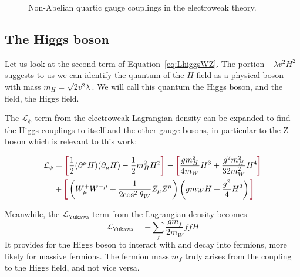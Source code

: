\begin{figure}[!hbt]
 \caption{Non-Abelian quartic gauge couplings in the electroweak theory.} \label{fig:4GC}
\end{figure}

\subsection{The Higgs boson}

Let us look at the second term of Equation~\ref{eq:LhiggsWZ}.
The portion $-\lambda v^2 H^2 $ suggests to us we can identify the quantum of the $H$-field as a physical boson with mass $m_H = \sqrt{2v^2\lambda}$.
We will call this quantum the Higgs boson, and the field, the Higgs field.

The $\mathcal{L}_\mathrm{\phi}$ term from the electroweak Lagrangian density can be expanded to find the Higgs couplings to itself and the other gauge bosons, in particular to the Z boson which is relevant to this work:

\begin{equation}
\begin{split}
\label{eq:L_phi}
\mathcal{L}_\mathrm{\phi} & = \termLB \frac{1}{2} (\partial^\mu H) (\partial_\mu H) - \frac{1}{2}m_H^2 H^2 \termRB - \termLB \frac{gm_H^2}{4m_W} H^3 + \frac{g^2m_H^2}{32m_W^2}H^4 \termRB \\
& + \termLB \left( W_\mu^+ W^{{-}\mu} + \frac{1}{2\mathrm{cos}^2\:\theta_W} Z_\mu Z^\mu \right) \left( gm_WH+\frac{g^2}{4}H^2 \right) \termRB
\end{split}
\end{equation}

Meanwhile, the $\mathcal{L}_\mathrm{Yukawa}$ term from the Lagrangian density becomes
\begin{equation}
\label{L_Yukawa}
\mathcal{L}_\mathrm{Yukawa} = {-} \sum_f \frac{gm_f}{2m_W} \bar{f}fH
\end{equation}
It provides for the Higgs boson to interact with and decay into fermions,
more likely for massive fermions.
The fermion mass $m_f$ truly arises from the coupling to the Higgs field, and not vice versa.

